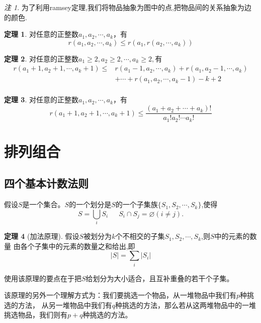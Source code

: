 \documentclass[a4paper,11pt]{article}%
\theoremstyle{remark}
\newtheorem*{remark}{注}
\theoremstyle{remark}
\theoremstyle{definition}
\newtheorem{theorem}{定理}[section]
\theoremstyle{definition}
\theoremstyle{definition}
\newcommand*{\abs}[1]{\lvert #1 \rvert}
\begin{document}
\begin{remark}
    为了利用ramsey定理,我们将物品抽象为图中的点,把物品间的关系抽象为边的颜色.
\end{remark}
\begin{theorem}
    对任意的正整数$a_1,a_2,\cdots,a_k$，有
    \[r(a_1,a_2,\cdots,a_k)\leq r(a_1,r(a_2,\cdots,a_k))\]
\end{theorem}
\begin{theorem}
    对任意的正整数$a_1\geq 2,a_2\geq 2,\cdots,a_k\geq 2,$有
    \[
        \begin{array}{rl}
            r(a_1+1,a_2+1,\cdots,a_k+1)\leq &r(a_1-1,a_2,\cdots,a_k)+r(a_1,a_2-1,\cdots,a_k)\\
            &+\cdots+r(a_1,a_2,\cdots,a_k-1)-k+2\\
        \end{array}
        \]
\end{theorem}
\begin{theorem}
    对任意的正整数$a_1,a_2,\cdots,a_k$，有
    \[r(a_1+1,a_2+1,\cdots,a_k+1)\leq \frac{(a_1+a_2+\cdots+a_k)!}{a_1!a_2!\cdots a_k!}\]
\end{theorem}
\section{排列组合}
\subsection{四个基本计数法则}
假设$S$是一个集合。$S$的一个划分是$S$的一个子集族$\{S_1,S_2,\cdots,S_k\}$,使得
\[S = \bigcup_i S_i\phantom{111}S_i\cap S_j=\varnothing(i\neq j).\]
\begin{theorem}[加法原理]
    假设$S$被划分为$k$个不相交的子集$S_1,S_2,\cdots,S_k$,则$S$中的元素的数量
    由各个子集中的元素的数量之和给出,即
    \[ \abs{S}=\sum_i\abs{S_i}\]
\end{theorem}
使用该原理的要点在于把$S$给划分为大小适合，且互补重叠的若干个子集。

该原理的另外一个理解方式为：我们要挑选一个物品，从一堆物品中我们有$p$种挑选的方法，
从另一堆物品中我们有$q$种挑选的方法，那么若从这两堆物品中的一堆挑选物品，我们则有$p+q$种挑选的方法。
\end{document}
